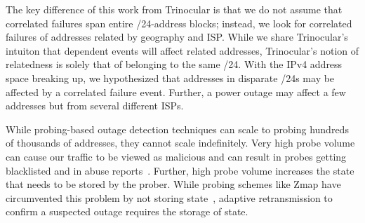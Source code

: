 The key difference of this work from Trinocular is that we do not assume
that correlated failures span entire /24-address blocks; instead, we
look for correlated failures of addresses related by geography and
ISP. While we share Trinocular's intuiton that dependent events will
affect related addresses, Trinocular's notion of relatedness is solely
that of belonging to the same /24. With the IPv4 address space
breaking up, we hypothesized that addresses in disparate /24s may be
affected by a correlated failure event. Further, a power outage may
affect a few addresses but from several different ISPs.



While probing-based outage detection techniques can scale to probing hundreds
of thousands of addresses, they cannot scale indefinitely. Very high
probe volume can cause our traffic to be viewed as malicious and can
result in probes getting blacklisted and in abuse
reports~\cite{durumeric2013zmap}. Further, high probe volume increases
the state that needs to be stored by the prober. While probing
schemes like Zmap have circumvented this problem by not storing
state~\cite{durumeric2013zmap}, adaptive retransmission to confirm a
suspected outage requires the storage of state.





